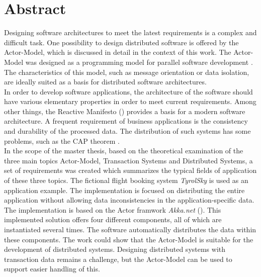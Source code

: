 
\chapter*{Abstract}
Designing software architectures to meet the latest requirements is a complex and difficult task. One possibility to design distributed software is offered by the  Actor-Model, which is discussed in detail in the context of this work. The  Actor-Model was designed as a programming model for parallel software development \citep{hewitt1973session}. The characteristics of this model, such as message orientation or data isolation, are ideally suited as a basis for distributed software architectures. \\
In order to develop software applications, the architecture of the software should have various elementary properties in order to meet current requirements. Among other things, the Reactive Manifesto (\cite{reactiveManifesto}) provides a basis for a modern software architecture. 
A frequent requirement of business applications is the consistency and durability of the processed data. The distribution of such systems has some problems, such as the CAP theorem \citep{gilbertPerspectiveCAPTheorem2012}. \\
In the scope of the master thesis, based on the theoretical examination of the three main topics  Actor-Model, Transaction Systems and Distributed Systems, a set of requirements was created which summarizes the typical fields of application of these three topics. The fictional flight booking system \textit{TyrolSky} is used as an application example. The implementation is focused on distributing the entire application without allowing data inconsistencies in the application-specific data. \\
The implementation is based on the Actor framwork \textit{Akka.net} (\cite{Akka.netCommunityAkka.NETDocumentation}). This implemented solution offers four different components, all of which are instantiated several times. The software automatically distributes the data within these components.
The work could show that the  Actor-Model is suitable for the development of distributed systems. Designing distributed systems with transaction data remains a challenge, but the  Actor-Model can be used to support easier handling of this.


\cleardoublepage
{} %